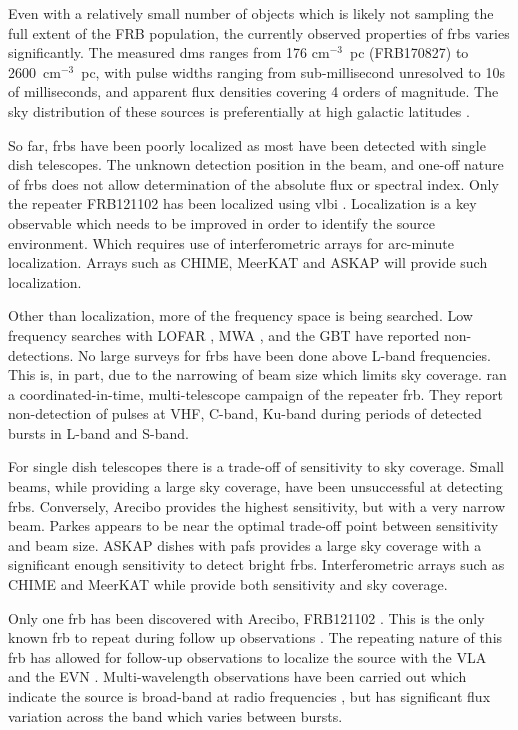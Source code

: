 \documentclass[a4paper,fleqn,usenatbib]{mnras}
\begin{document}
Even with a relatively small number of objects which is likely not sampling the
full extent of the FRB population, the currently observed properties of
\glspl{frb} varies significantly.  The measured \glspl{dm} ranges from 176
cm$^{-3}$~pc (FRB170827) to 2600~cm$^{-3}$~pc, with pulse widths ranging from
sub-millisecond unresolved to 10s of milliseconds, and apparent flux densities
covering 4 orders of magnitude. The sky distribution of these sources is
preferentially at high galactic latitudes \citep{2015MNRAS.451.3278M}.

So far, \glspl{frb} have been poorly localized as most have been detected with
single dish telescopes. The unknown detection position in the beam, and one-off
nature of \glspl{frb} does not allow determination of the absolute flux or
spectral index. Only the repeater FRB121102 has been localized using \gls{vlbi}
\citep{2017ApJ...834L...8M, 2017ApJ...834L...7T}. Localization is a key
observable which needs to be improved in order to identify the source
environment. Which requires use of interferometric arrays for arc-minute
localization. Arrays such as CHIME, MeerKAT and ASKAP will provide such
localization.

Other than localization, more of the frequency space is being searched. Low
frequency searches with LOFAR \citep{2015MNRAS.452.1254K}, MWA
\citep{2015AJ....150..199T}, and the GBT \citep{2017arXiv170107457C} have
reported non-detections.  No large surveys for \glspl{frb} have been done above
L-band frequencies. This is, in part, due to the narrowing of beam size which
limits sky coverage.  \cite{2017arXiv170507553L} ran a coordinated-in-time,
multi-telescope campaign of the repeater \gls{frb}.  They report non-detection
of pulses at VHF, C-band, Ku-band during periods of detected bursts in L-band
and S-band.

For single dish telescopes there is a trade-off of sensitivity to sky coverage.
Small beams, while providing a large sky coverage, have been unsuccessful at
detecting \glspl{frb}. Conversely, Arecibo provides the highest sensitivity, but
with a very narrow beam. Parkes appears to be near the optimal trade-off point
between sensitivity and beam size.  ASKAP dishes with \glspl{paf} provides a
large sky coverage with a significant enough sensitivity to detect bright
\glspl{frb}. Interferometric arrays such as CHIME and MeerKAT while provide both
sensitivity and sky coverage.

Only one \gls{frb} has been discovered with Arecibo, FRB121102
\citep{2014ApJ...790..101S}. This is the only known \gls{frb} to repeat during
follow up observations \citep{2016Natur.531..202S}. The repeating nature of this
\gls{frb} has allowed for follow-up observations to localize the source with the
VLA \citep{2017Natur.541...58C} and the EVN \citep{2017ApJ...834L...8M}.
Multi-wavelength observations have been carried out which indicate the source is
broad-band at radio frequencies \citep{2017arXiv170507553L,atel10675}, but has
significant flux variation across the band which varies between bursts. 
\end{document}
